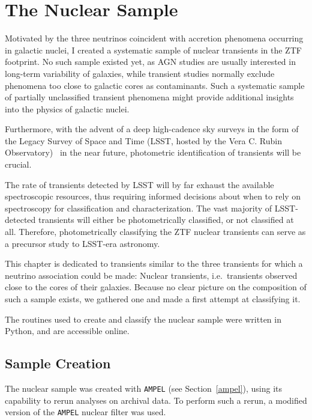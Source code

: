 \chapter{The Nuclear Sample}\label{nucsam}
Motivated by the three neutrinos coincident with accretion phenomena occurring in galactic nuclei, I created a systematic sample of nuclear transients in the ZTF footprint. No such sample existed yet, as AGN studies are usually interested in long-term variability of galaxies, while transient studies normally exclude phenomena too close to galactic cores as contaminants. Such a systematic sample of partially unclassified transient phenomena might provide additional insights into the physics of galactic nuclei.

Furthermore, with the advent of a deep high-cadence sky surveys in the form of the Legacy Survey of Space and Time (LSST, hosted by the Vera C. Rubin Observatory)~ in the near future, photometric identification of transients will be crucial.

The rate of transients detected by LSST will by far exhaust the available spectroscopic resources, thus requiring informed decisions about when to rely on spectroscopy for classification and characterization. The vast majority of LSST-detected transients will either be photometrically classified, or not classified at all. Therefore, photometrically classifying the ZTF nuclear transients can serve as a precursor study to LSST-era astronomy.

This chapter is dedicated to transients similar to the three transients for which a neutrino association could be made: Nuclear transients, i.e.~transients observed close to the cores of their galaxies. Because no clear picture on the composition of such a sample exists, we gathered one and made a first attempt at classifying it.

The routines used to create and classify the nuclear sample were written in Python, and are accessible online.

\section{Sample Creation}
The nuclear sample was created with \texttt{AMPEL} (see Section~\ref{ampel}), using its capability to rerun analyses on archival data. To perform such a rerun, a modified version of the \texttt{AMPEL} nuclear filter was used.

